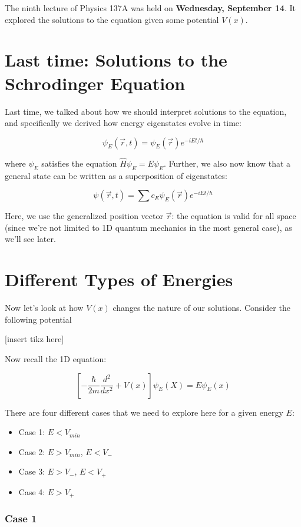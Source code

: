 The ninth lecture of Physics 137A was held on \textbf{Wednesday, September 14}. It explored the solutions to the \schrodinger equation given some potential $V(x)$. 

\section{Last time: Solutions to the Schrodinger Equation}

Last time, we talked about how we should interpret solutions to the \schrodinger equation, and specifically we derived how energy eigenstates evolve in time: 

\[ \psi_E(\vec{r}, t) = \psi_E\left(\vec r\right) e^{-iEt/\hbar}\] 

where $\psi_E$ satisfies the equation $\hat H \psi_E = E \psi_E$. Further, we also now know that a general state can be written as a superposition of eigenstates: 

\[ \psi(\vec{r}, t) = \sum c_E \psi_E\left(\vec r\right) e^{-iEt/\hbar}\] 

Here, we use the generalized position vector $\vec r$: the \schrodinger equation is valid for all space (since we're not limited to 1D quantum mechanics in the most general case), as we'll see later.

\section{Different Types of Energies}

Now let's look at how $V(x)$ changes the nature of our solutions. Consider the following potential 

[insert tikz here]

Now recall the 1D \schrodinger equation: 

\[ \left[ -\frac{\hbar}{2m} \frac{d^2}{dx^2} + V(x) \right] \psi_E(X) = E\psi_E(x)\]

There are four different cases that we need to explore here for a given energy $E$: 

\begin{itemize}
    \item Case 1: $E < V_{min}$
    \item Case 2: $E > V_{min}$, $E < V_-$ 
    \item Case 3: $E > V_-$, $E < V_+$
    \item Case 4: $E > V_+$
\end{itemize}

\subsubsection*{Case 1}


